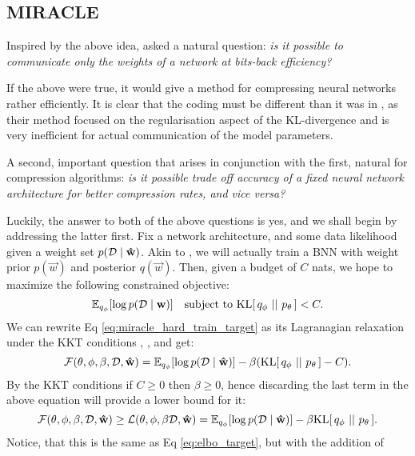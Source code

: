 \subsection{MIRACLE}
\label{sec:miracle_theory}
Inspired by the above idea, \cite{havasi2018minimal} asked a natural question:
\textit{is it possible to communicate only the weights of a network at
  bits-back efficiency?}
\par
If the above were true, it would give a method for compressing neural networks
rather efficiently. It is clear that the coding must be different than it was in
\cite{hinton1993keeping}, as their method focused on the regularisation aspect
of the KL-divergence and is very inefficient for actual communication of the
model parameters.
\par
A second, important question that arises in conjunction with the first, natural
for compression algorithms:
\textit{is it possible trade off accuracy of a fixed neural network architecture
  for better compression rates, and vice versa?}
\par
Luckily, the answer to both of the above questions is yes, and we shall begin by
addressing the latter first. Fix a network architecture, and some data
likelihood given a weight set $p(\mathcal{D} \mid \mathbf{\hat{w}})$. Akin to
\cite{hinton1993keeping}, we will actually train a BNN with weight prior
$p(\vec{w})$ and posterior $q(\vec{w})$. Then, given a budget of $C$ nats, we
hope to maximize the following constrained objective:
\begin{equation}
\label{eq:miracle_hard_train_target}
\mathbb{E}_{q_\phi}[\log p(\mathcal{D} \mid \mathbf{w})] \quad \text{subject to }
\mathrm{KL}[\,q_{\phi}\,\,||\,\,p_{\theta}\,] < C.
\end{equation}
We can rewrite Eq \ref{eq:miracle_hard_train_target} as its Lagranagian
relaxation under the KKT conditions \cite{karush2014minima},
\cite{kuhn2014nonlinear}, \cite{higgins2017beta} and get:
\[
  \mathcal{F}(\theta, \phi, \beta, \mathcal{D}, \mathbf{\hat{w}}) = 
  \mathbb{E}_{q_\phi}[\log p(\mathcal{D} \mid \mathbf{\hat{w}})] - \beta (\mathrm{KL}[\,q_{\phi}\,\,||\,\,p_{\theta}\,] - C).
\]
By the KKT conditions if $C \geq 0$ then $\beta \geq 0$, hence discarding the last
term in the above equation will provide a lower bound for it:
\begin{equation}
\label{eq:miracle_train_target}
\mathcal{F}(\theta, \phi, \beta, \mathcal{D}, \mathbf{\hat{w}}) \geq
\mathcal{L}(\theta, \phi, \beta \mathcal{D}, \mathbf{\hat{w}}) =
\mathbb{E}_{q_\phi}[\log p(\mathcal{D} \mid \mathbf{\hat{w}})] - \beta \mathrm{KL}[\,q_{\phi}\,\,||\,\,p_{\theta}\,].
\end{equation}
Notice, that this is the same as Eq \ref{eq:elbo_target}, but with the addition of
